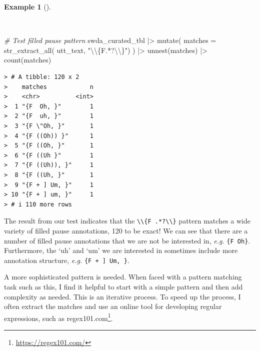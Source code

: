 \documentclass[
  letterpaper,
  DIV=11,
  numbers=noendperiod]{scrreport}
\newenvironment{Shaded}{\begin{snugshade}}{\end{snugshade}}
\newcommand{\AttributeTok}[1]{\textcolor[rgb]{0.00,0.00,0.00}{#1}}
\newcommand{\CommentTok}[1]{\textcolor[rgb]{0.00,0.00,0.00}{\textit{#1}}}
\newcommand{\FunctionTok}[1]{\textcolor[rgb]{0.00,0.00,0.00}{#1}}
\newcommand{\NormalTok}[1]{\textcolor[rgb]{0.00,0.00,0.00}{#1}}
\newcommand{\SpecialCharTok}[1]{\textcolor[rgb]{0.00,0.00,0.00}{#1}}
\newcommand{\StringTok}[1]{\textcolor[rgb]{0.00,0.00,0.00}{#1}}
\theoremstyle{definition}
\newtheorem{example}{Example}[chapter]
\theoremstyle{remark}
\DeclareRobustCommand{\href}[2]{#2\footnote{\url{#1}}}
\begin{document}
\begin{example}[]\protect\hypertarget{exm-td-swda-recoding-filled-pauses-test}{}\label{exm-td-swda-recoding-filled-pauses-test}

~

\begin{Shaded}
\begin{Highlighting}[]
\CommentTok{\# Test filled pause pattern}
\NormalTok{swda\_curated\_tbl }\SpecialCharTok{|\textgreater{}}
  \FunctionTok{mutate}\NormalTok{(}
    \AttributeTok{matches =} \FunctionTok{str\_extract\_all}\NormalTok{(}
\NormalTok{      utt\_text, }
      \StringTok{"}\SpecialCharTok{\textbackslash{}\textbackslash{}}\StringTok{\{F.*?}\SpecialCharTok{\textbackslash{}\textbackslash{}}\StringTok{\}"}\NormalTok{)}
\NormalTok{  ) }\SpecialCharTok{|\textgreater{}}
  \FunctionTok{unnest}\NormalTok{(matches) }\SpecialCharTok{|\textgreater{}} 
  \FunctionTok{count}\NormalTok{(matches)}
\end{Highlighting}
\end{Shaded}

\begin{verbatim}
> # A tibble: 120 x 2
>    matches            n
>    <chr>          <int>
>  1 "{F  Oh, }"        1
>  2 "{F  uh, }"        1
>  3 "{F \"Oh, }"       1
>  4 "{F ((Oh)) }"      1
>  5 "{F ((Oh, }"       1
>  6 "{F ((Uh }"        1
>  7 "{F ((Uh)), }"     1
>  8 "{F ((Uh, }"       1
>  9 "{F + ] Um, }"     1
> 10 "{F + ] um, }"     1
> # i 110 more rows
\end{verbatim}

\end{example}

The result from our test indicates that the
\texttt{\textbackslash{}\textbackslash{}\{F\ .*?\textbackslash{}\textbackslash{}\}}
pattern matches a wide variety of filled pause annotations, 120 to be
exact! We can see that there are a number of filled pause annotations
that we are not be interested in, \emph{e.g.} \texttt{\{F\ Oh\}}.
Furthermore, the `uh' and `um' we are interested in sometimes include
more annotation structure, \emph{e.g.} \texttt{\{F\ +\ {]}\ Um,\ \}}.

A more sophisticated pattern is needed. When faced with a pattern
matching task such as this, I find it helpful to start with a simple
pattern and then add complexity as needed. This is an iterative process.
To speed up the process, I often extract the matches and use an online
tool for developing regular expressions, such as
\href{https://regex101.com/}{regex101.com}.
\end{document}
